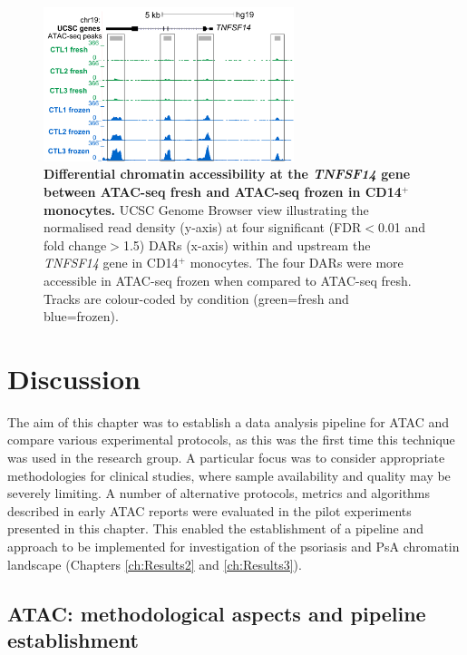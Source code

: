 	
\begin{figure}[htbp]
\centering
\includegraphics[width=0.65\textwidth]{./Results1/pdfs/Core_CD14_TNFSF14_track_UCSC}
\caption[Differential chromatin accessibility at the \textit{TNFSF14} gene between ATAC-seq fresh and ATAC-seq frozen in CD14$^+$ monocytes.]{\textbf{Differential chromatin accessibility at the \textit{TNFSF14} gene between ATAC-seq fresh and ATAC-seq frozen in CD14$^+$ monocytes.} UCSC Genome Browser view illustrating the normalised read density (y-axis) at four significant (FDR$<$0.01 and fold change$>$1.5) DARs (x-axis) within and upstream the \textit{TNFSF14} gene in CD14$^+$ monocytes. The four DARs were more accessible in ATAC-seq frozen when compared to ATAC-seq fresh. Tracks are colour-coded by condition (green=fresh and blue=frozen).}
\label{figure:Core_CD14_differential_TNFSF14}
\end{figure} 	






\section{Discussion}

The aim of this chapter was to establish a data analysis pipeline for ATAC and compare various experimental protocols, as this was the first time this technique was used in the research group. A particular focus was to consider appropriate methodologies for clinical studies, where sample availability and quality may be severely limiting. A number of alternative protocols, metrics and algorithms described in early ATAC reports were evaluated in the pilot experiments presented in this chapter. This enabled the establishment of a pipeline and approach to be implemented for investigation of the psoriasis and PsA chromatin landscape (Chapters \ref{ch:Results2} and \ref{ch:Results3}).

\subsection{ATAC: methodological aspects and pipeline establishment}

